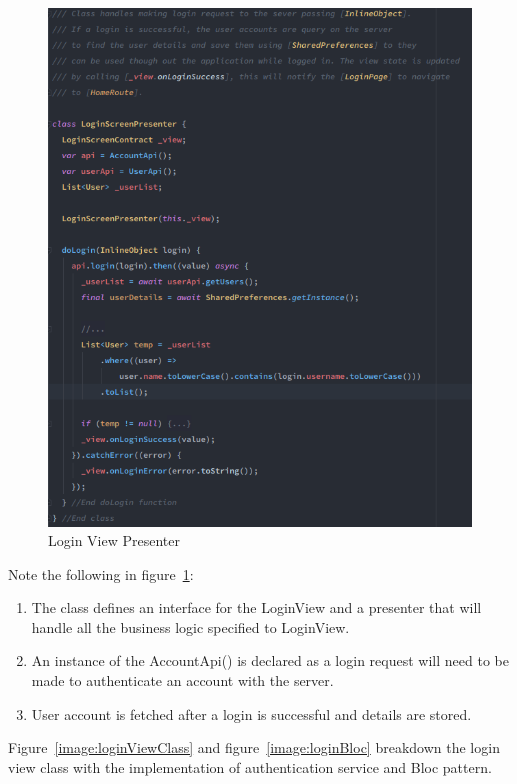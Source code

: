 \begin{figure}[h!]
    \caption{Login View Presenter}
    \label{image:loginViewPresenter}
    \centering
    \includegraphics[width=1.0\textwidth]{images/login_presenter_class.png}
\end{figure}

Note the following in figure~\ref{image:loginViewPresenter}:
\begin{enumerate}
    \item The class defines an interface for the LoginView and a presenter that will handle all the business logic specified to LoginView.
    \item An instance of the AccountApi() is declared as a login request will need to be made to authenticate an account with the server.
    \item User account is fetched after a login is successful and details are stored.
\end{enumerate}

Figure~\ref{image:loginViewClass} and figure~\ref{image:loginBloc} breakdown the login view class with the implementation of authentication service and Bloc pattern. 

